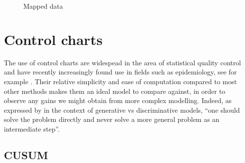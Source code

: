 \documentclass[11pt]{report}
\begin{document}
\begin{figure}
\centering
{}
\caption{Mapped data}
\end{figure}

\chapter{Control charts}


The use of control charts are widespead in the area of statistical quality control and have recently increasingly found use in fields such as epidemiology, see for example \citet{mei}. Their relative simplicity and ease of computation compared to most other methods makes them an ideal model to compare against, in order to observe any gains we might obtain from more complex modelling. Indeed, as expressed by \citet{vapnik} in the context of generative vs discriminative models, ``one should solve the problem directly and never solve a more general problem as an intermediate step''. \\

\section{CUSUM}
\end{document}
